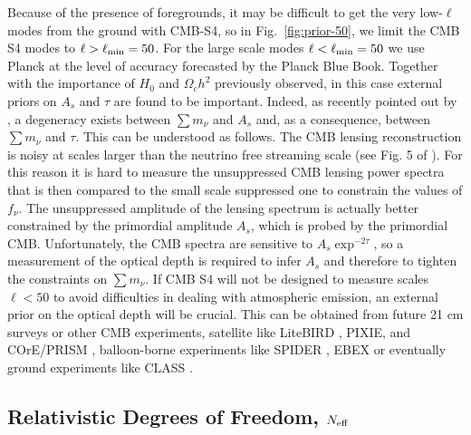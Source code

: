 \documentclass[aps,prd,reprint,superscriptaddress,nofootinbib,floatfix]{revtex4-1}
\newcommand{\reffig}[1]{Fig.~\ref{fig:#1}}
\begin{document}

Because of the presence of foregrounds, it may be difficult to get the very low-$\ell$ modes from the ground with CMB-S4, so in \reffig{prior-50}, we limit the CMB S4 modes to $\ell>\ell_{\rm min}=50$. For the large scale modes $\ell<\ell_{\rm min}=50$ we use Planck at the level of accuracy forecasted by the Planck Blue Book.  
Together with the importance of $H_{0}$ and $\Omega_ch^2$ previously observed, in this case external priors on $A_{s}$ and $\tau$ are found to be important. 
Indeed, as recently pointed out by \cite{allison:2015}, a degeneracy exists between $\sum m_\nu$ and $A_{s}$ and, as a consequence, between $\sum m_\nu$ and $\tau$. This can be understood as follows.
The CMB lensing reconstruction is noisy at scales larger than the neutrino free streaming scale (see Fig. 5 of \cite{2013arXiv1309.5383A}). For this reason it is hard to measure the unsuppressed CMB lensing power spectra that is then compared to the small scale suppressed one to constrain the values of $f_{\nu}$. The unsuppressed amplitude of the lensing spectrum is actually better constrained by the primordial amplitude $A_{s}$, which is probed by the primordial CMB. Unfortunately, the CMB spectra are sensitive to $A_{s}\exp^{-2\tau}$, so a measurement of the optical depth is required to infer $A_{s}$ and therefore to tighten the constraints on $\sum m_\nu$. If CMB S4 will not be designed to measure scales $\ell<50$ to avoid difficulties in dealing with atmospheric emission, an external prior on the optical depth will be crucial. This can be obtained from future 21 cm surveys \cite{liu:2015} or other CMB experiments, satellite like LiteBIRD \cite{matsumura:2014}, PIXIE\cite{kogut:2011}, and COrE/PRISM \cite{the-core-collaboration:2011,prism-collaboration:2013}, balloon-borne experiments like SPIDER \cite{filippini:2010}, EBEX \cite{reichborn-kjennerud:2010} or eventually ground experiments like CLASS \cite{essinger-hileman:2014}.

\subsection{Relativistic Degrees of Freedom, $N_{\rm eff}$}
\end{document}
